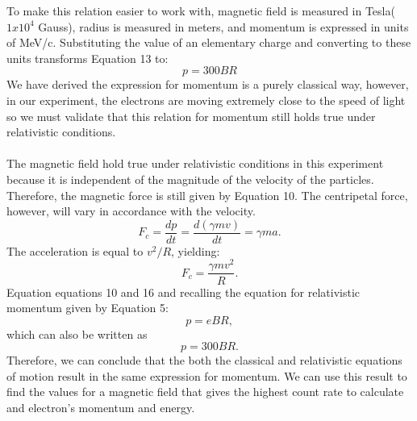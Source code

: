 To make this relation easier to work with, magnetic field is measured in Tesla($1x10^4$ Gauss), radius is measured in meters, and momentum is expressed in units of MeV/c. Substituting the value of an elementary charge and converting to these units transforms Equation 13 to:
\begin{equation} p=300BR\end{equation}
We have derived the expression for momentum is a purely classical way, however, in our experiment, the electrons are moving extremely close to the speed of light so we must validate that this relation for momentum still holds true under relativistic conditions.
\\
\\
The magnetic field hold true under relativistic conditions in this experiment because it is independent of the magnitude of the velocity of the particles. Therefore, the magnetic force is still given by Equation 10. The centripetal force, however, will vary in accordance with the velocity. 
\begin {equation} F_c=\frac{dp}{dt}=\frac{d(\gamma mv)}{dt}=\gamma ma. \end{equation}The acceleration is equal to $v^2/R$, yielding:
\begin{equation}F_c=\frac{\gamma mv^2}{R}.\end{equation} Equation equations 10 and 16 and  recalling the equation for relativistic momentum given by Equation 5:
\begin{equation}p=eBR,\end{equation} which can also be written as \begin{equation} p=300BR.\end{equation} Therefore, we can conclude that the both the classical and relativistic equations of motion result in the same expression for momentum. We can use this result to find the values for a magnetic field that gives the highest count rate to calculate and electron's momentum and energy. 

